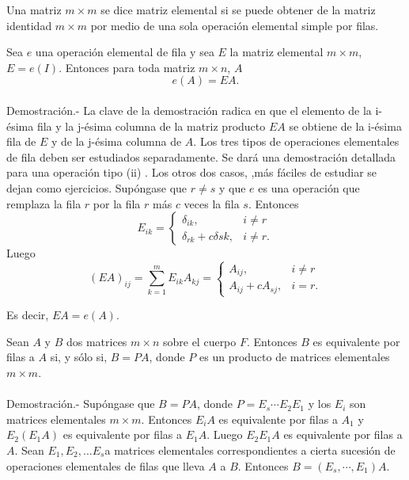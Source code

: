     \begin{def.}
	Una matriz $m\times m$ se dice matriz elemental si se puede obtener de la matriz identidad $m\times m$ por medio de una sola operación elemental simple por filas.
    \end{def.}

\begin{teo}
    Sea $e$ una operación elemental de fila y sea $E$ la matriz elemental $m\times m$, $E=e(I)$. Entonces para toda matriz $m\times n$, $A$
    $$e(A)=EA.$$\\
	Demostración.-\; La clave de la demostración radica en que el elemento de la i-ésima fila y la j-ésima columna de la matriz producto $EA$ se obtiene de la i-ésima fila de $E$ y de la j-ésima columna de $A$. Los tres tipos de operaciones elementales de fila deben ser estudiados separadamente. Se dará una demostración detallada para una operación tipo (ii) . Los otros dos casos, ,más fáciles de estudiar se dejan como ejercicios. Supóngase que $r\neq s$ y que $e$ es una operación que remplaza la fila $r$ por la fila $r$ más $c$ veces la fila $s$. Entonces
	$$E_{ik}=\left\{\begin{array}{ll}
		\delta_{ik}, & i\neq r\\
		\delta_{rk} + c\delta sk, & i\neq r.
    \end{array}\right.$$
    Luego
    $$ (EA)_{ij}=\sum_{k=1}^m E_{ik}A_{kj} = \left\{\begin{array}{ll}
	    		A_{ij}, & i\neq r\\
			A_{ij} + cA_{sj}, & i=r.
    \end{array}\right.$$

    Es decir, $EA=e(A).$
\end{teo}

\begin{cor}
    Sean $A$ y $B$ dos matrices $m\times n$ sobre el cuerpo $F$. Entonces $B$ es equivalente por filas a $A$ si, y sólo si, $B=PA$, donde $P$ es un producto de matrices elementales $m\times m$.\\\\
	Demostración.-\; Supóngase que $B=PA$, donde $P=E_s\cdots E_2E_1$ y los $E_i$ son matrices elementales $m\times m$. Entonces $E_iA$ es equivalente por filas a $A_1$ y $E_2(E_1A)$ es equivalente por filas a $E_1A$. Luego $E_2E_1A$ es equivalente por filas a $A$. Sean $E_1,E_2,\ldots E_s$a matrices elementales correspondientes a cierta sucesión de operaciones elementales de filas que lleva $A$ a $B$. Entonces $B=(E_s,\cdots , E_1)A.$
\end{cor}


